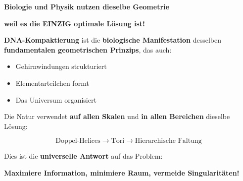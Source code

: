 	\begin{revolutionary}[Die Wahrheit]
		
		\begin{center}
			\textbf{Biologie und Physik nutzen dieselbe Geometrie}
			
			\vspace{0.3cm}
			
			\textbf{weil es die EINZIG optimale Lösung ist!}
		\end{center}
		
		\normalsize
		
		\vspace{0.3cm}
		
		\textbf{DNA-Kompaktierung} ist die \textbf{biologische Manifestation} desselben \textbf{fundamentalen geometrischen Prinzips}, das auch:
		
		\begin{itemize}
			\item Gehirnwindungen strukturiert
			\item Elementarteilchen formt
			\item Das Universum organisiert
		\end{itemize}
		
		\vspace{0.3cm}
		
		Die Natur verwendet \textbf{auf allen Skalen} und \textbf{in allen Bereichen} dieselbe Lösung:
		
		\begin{equation}
			\boxed{\text{Doppel-Helices} \to \text{Tori} \to \text{Hierarchische Faltung}}
		\end{equation}
		
		\vspace{0.3cm}
		
		Dies ist die \textbf{universelle Antwort} auf das Problem: 
		
		\textbf{Maximiere Information, minimiere Raum, vermeide Singularitäten!}
	\end{revolutionary}
	
